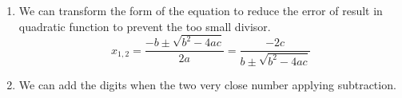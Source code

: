 \begin{solution}
\begin{enumerate}
	\item We can transform the form of the equation to reduce the error of result in quadratic function to prevent the too small divisor.
	\begin{equation*}
		x_{1,2}=\frac{-b \pm \sqrt{b^2-4ac}}{2a}=\frac{-2 c}{b \pm \sqrt{b^{2}-4 a c}}
	\end{equation*}
	\item We can add the digits when the two very close number applying subtraction.
\end{enumerate}


















\end{solution}



















